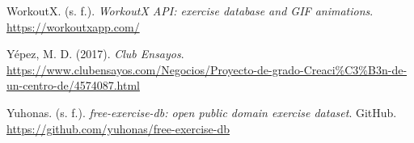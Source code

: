 \begin{referenciasapa}
\item WorkoutX. (s. f.). \textit{WorkoutX API: exercise database and GIF animations}. \url{https://workoutxapp.com/}

\item Yépez, M. D. (2017). \textit{Club Ensayos}. \url{https://www.clubensayos.com/Negocios/Proyecto-de-grado-Creaci\%C3\%B3n-de-un-centro-de/4574087.html}

\item Yuhonas. (s. f.). \textit{free-exercise-db: open public domain exercise dataset}. GitHub. \url{https://github.com/yuhonas/free-exercise-db}


\end{referenciasapa}
